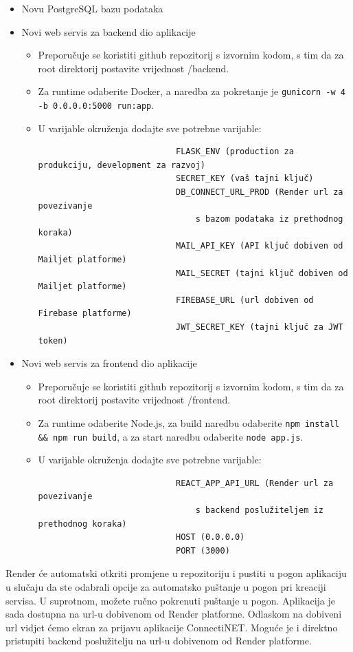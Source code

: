 			\begin{itemize}
					\item Novu PostgreSQL bazu podataka
					\item Novi web servis za backend dio aplikacije
					\begin{itemize}
							\item Preporučuje se koristiti github repozitorij s izvornim kodom, s tim da za root direktorij postavite vrijednost /backend.
							\item Za runtime odaberite Docker, a naredba za pokretanje je \texttt{gunicorn -w 4 -b 0.0.0.0:5000 run:app}.
							\item U varijable okruženja dodajte sve potrebne varijable:
							\begin{verbatim}
							FLASK_ENV (production za produkciju, development za razvoj)
							SECRET_KEY (vaš tajni ključ)
							DB_CONNECT_URL_PROD (Render url za povezivanje 
								s bazom podataka iz prethodnog koraka)
							MAIL_API_KEY (API ključ dobiven od Mailjet platforme)
							MAIL_SECRET (tajni ključ dobiven od Mailjet platforme)
							FIREBASE_URL (url dobiven od Firebase platforme)
							JWT_SECRET_KEY (tajni ključ za JWT token)
							\end{verbatim}
					\end{itemize}
					\item Novi web servis za frontend dio aplikacije
					\begin{itemize}
							\item Preporučuje se koristiti github repozitorij s izvornim kodom, s tim da za root direktorij postavite vrijednost /frontend.
							\item Za runtime odaberite Node.js, za build naredbu odaberite \texttt{npm install && npm run build}, a za start naredbu odaberite \texttt{node app.js}.
							\item U varijable okruženja dodajte sve potrebne varijable:
							\begin{verbatim}
							REACT_APP_API_URL (Render url za povezivanje 
								s backend poslužiteljem iz prethodnog koraka)
							HOST (0.0.0.0)
							PORT (3000)
							\end{verbatim}
					\end{itemize}
			\end{itemize}
			
			Render će automatski otkriti promjene u repozitoriju i pustiti u pogon aplikaciju u slučaju da ste odabrali opcije za automatsko puštanje u pogon pri kreaciji servisa. U suprotnom, možete ručno pokrenuti puštanje u pogon. Aplikacija je sada dostupna na url-u dobivenom od Render platforme. Odlaskom na dobiveni url vidjet ćemo ekran za prijavu aplikacije ConnectiNET. Moguće je i direktno pristupiti backend poslužitelju na url-u dobivenom od Render platforme.
			\eject 